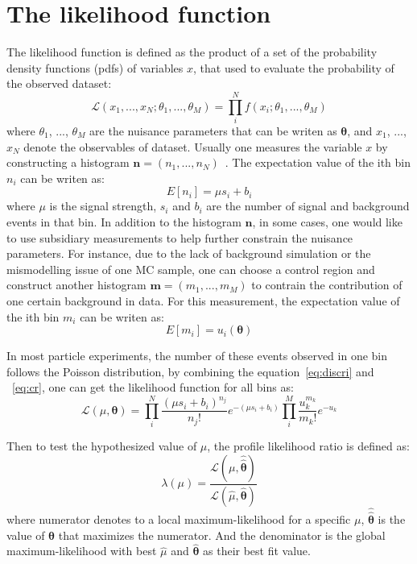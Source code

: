 \section{The likelihood function}

The likelihood function is defined as the product of a set of the probability density functions (pdfs) of variables $x$, that used to evaluate the probability of the observed dataset:
\begin{equation}
    \mathcal{L} (x_{1}, ..., x_{N}; \theta_{1}, ..., \theta_{M}) = \prod_{i}^{N} f(x_{i}; \theta_{1}, ..., \theta_{M})
\end{equation}
where $\theta_{1}$, ..., $\theta_{M}$ are the nuisance parameters that can be writen as $\pmb{\theta}$,
and $x_{1}$, ..., $x_{N}$ denote the observables of dataset. 
Usually one measures the variable $x$ by constructing a histogram $\pmb{n} = (n_{1}, ..., n_{N})$~\cite{}.
The expectation value of the ith bin $n_{i}$ can be writen as:
\begin{equation}\label{eq:discri}
    E[n_{i}] = \mu s_{i} + b_{i}
\end{equation}
where $\mu$ is the signal strength, $s_{i}$ and $b_{i}$ are the number of signal and background events in that bin.
In addition to the histogram $\pmb{n}$, in some cases, one would like to use subsidiary measurements to help further constrain the nuisance parameters.
For instance, due to the lack of background simulation or the mismodelling issue of one MC sample, one can choose a control region and construct another histogram $\pmb{m} = (m_{1}, ..., m_{M})$ to contrain the contribution of one certain background in data.
For this measurement, the expectation value of the ith bin $m_{i}$ can be writen as:
\begin{equation}\label{eq:cr}
    E[m_i] = u_i(\pmb{\theta})
\end{equation}

In most particle experiments, the number of these events observed in one bin follows the Poisson distribution,
by combining the equation~\ref{eq:discri} and ~\ref{eq:cr}, one can get the likelihood function for all bins as:
\begin{equation}
    \mathcal{L} (\mu, \pmb{\theta}) = \prod_{i}^{N} \frac{(\mu s_{i} + b_{i})^{n_j}}{n_j !} e^{-(\mu s_{i} + b_{i})}
    \prod_{i}^{M} \frac{u_k^{m_k}}{m_k !} e^{-u_k}
\end{equation}

Then to test the hypothesized value of $\mu$, the profile likelihood ratio is defined as:
\begin{equation} \label{eq:lambda}
    \lambda (\mu) = \frac{\mathcal{L}(\mu, \pmb{\hat{\hat{\theta}}})}{\mathcal{L}(\hat{\mu}, \pmb{\hat{\theta}})}
\end{equation}
where numerator denotes to a local maximum-likelihood for a specific $\mu$, $\pmb{\hat{\hat{\theta}}}$ is the value of $\pmb{\theta}$ that maximizes the numerator.
And the denominator is the global maximum-likelihood with best $\hat{\mu}$ and $\pmb{\hat{\theta}}$ as their best fit value.
